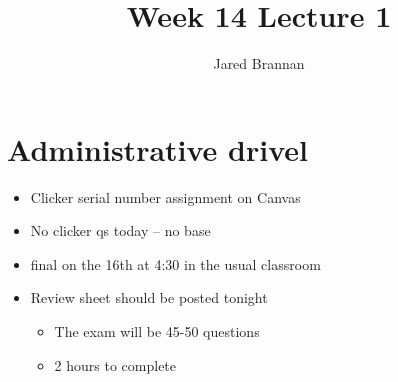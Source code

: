 \documentclass{article}
\title{Week 14 Lecture 1}
\author{Jared Brannan }
\theoremstyle{definition}
\begin{document}
\maketitle

\section{Administrative drivel}
\begin{itemize}
	\item Clicker serial number assignment on Canvas
	\item No clicker qs today -- no base
	\item final on the 16th at 4:30 in the usual classroom
	\item Review sheet should be posted tonight
		\begin{itemize}
			\item The exam will be 45-50 questions
			\item 2 hours to complete
		\end{itemize}
\end{itemize}
\end{document}

